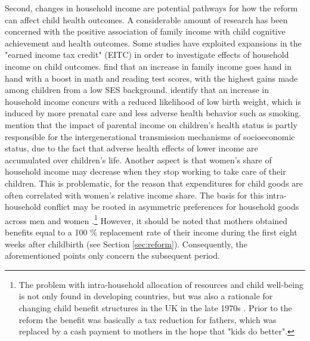 \documentclass[a4paper ]{article}
\begin{document}
Second, changes in household income are potential pathways for how the reform can affect child health outcomes. A considerable amount of research has been concerned with the positive association of family income with child cognitive achievement and health outcomes. Some studies have exploited expansions in the "earned income tax credit" (EITC) in order to investigate effects of household income on child outcomes. \cite{dahl2012impact} find that an increase in family income goes hand in hand with a boost in math and reading test scores, with the highest gains made among children from a low SES background. \cite{hoynes2015income} identify that an increase in household income concurs with a reduced likelihood of low birth weight, which is induced by more prenatal care and less adverse health behavior such as smoking.\newline \cite{case2002economic} mention that the impact of parental income on children's health status is partly responsible for the intergenerational transmission mechanisms of socioeconomic status, due to the fact that adverse health effects of lower income are accumulated over children's life.\newline
Another aspect is that women's share of household income may decrease when they stop working to take care of their children. This is problematic, for the reason that expenditures for child goods are often correlated with women's relative income share. The basis for this intra-household conflict may be rooted in asymmetric preferences for household goods across men and women \citep{anderson2002economics}.\footnote{The problem with intra-household allocation of resources and child well-being is not only found in developing countries, but was also a rationale for changing child benefit structures in the UK in the late 1970s \citep{lundberg1996bargaining}. Prior to the reform the benefit was basically a tax reduction for fathers, which was replaced by a cash payment to mothers in the hope that "kids do better".}\newline
However, it should be noted that mothers obtained benefits equal to a 100 \% replacement rate of their income during the first eight weeks after childbirth (see Section \ref{sec:reform}). Consequently, the aforementioned points only concern the subsequent period.\newline
\end{document}
